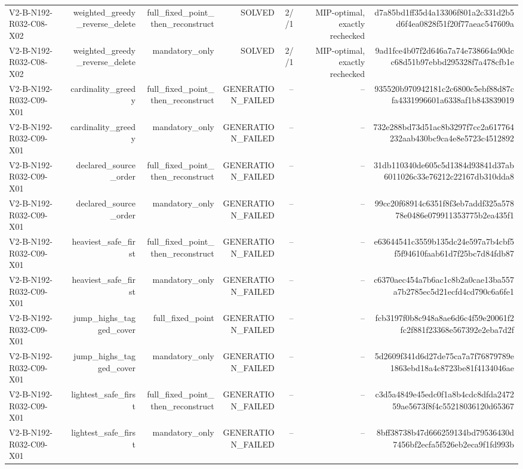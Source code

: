 {\begin{longtable}{lrrrrrr}
V2-B-N192-R032-C08-X02 & weighted\_greedy\_reverse\_delete & full\_fixed\_point\_then\_reconstruct & SOLVED & 2//1 & MIP-optimal, exactly rechecked & d7a85bd1ff35d4a13306f801a2c331d2b5d6f4ea0828f51f20f77aeac547609a \\
V2-B-N192-R032-C08-X02 & weighted\_greedy\_reverse\_delete & mandatory\_only & SOLVED & 2//1 & MIP-optimal, exactly rechecked & 9ad1fce4b07f2d646a7a74e738664a90dcc68d51b97ebbd295328f7a478cfb1e \\
V2-B-N192-R032-C09-X01 & cardinality\_greedy & full\_fixed\_point\_then\_reconstruct & GENERATION\_FAILED & -- & -- & 935520b970942181c2c6800c5ebf88d87cfa4331996601a6338af1b843839019 \\
V2-B-N192-R032-C09-X01 & cardinality\_greedy & mandatory\_only & GENERATION\_FAILED & -- & -- & 732e288bd73d51ac8b3297f7cc2a617764232aab430bc9ca4e8e5723c4512892 \\
V2-B-N192-R032-C09-X01 & declared\_source\_order & full\_fixed\_point\_then\_reconstruct & GENERATION\_FAILED & -- & -- & 31db110340de605c5d1384d93841d37ab6011026c33e76212c22167db310dda8 \\
V2-B-N192-R032-C09-X01 & declared\_source\_order & mandatory\_only & GENERATION\_FAILED & -- & -- & 99cc20f68914c6351f8f3eb7addf325a57878e0486e079911353775b2ea435f1 \\
V2-B-N192-R032-C09-X01 & heaviest\_safe\_first & full\_fixed\_point\_then\_reconstruct & GENERATION\_FAILED & -- & -- & e63644541c3559b135dc24e597a7b4cbf5f5f94610faab61d7f25bc7d84fdb87 \\
V2-B-N192-R032-C09-X01 & heaviest\_safe\_first & mandatory\_only & GENERATION\_FAILED & -- & -- & c6370aec454a7b6ac1c8b2a0cae13ba557a7b2785ec5d21ecfd4cd790c6a6fe1 \\
V2-B-N192-R032-C09-X01 & jump\_highs\_tagged\_cover & full\_fixed\_point & GENERATION\_FAILED & -- & -- & fcb3197f0b8c948a8ae6d6c4f59e20061f2fc2f881f23368e567392e2eba7d2f \\
V2-B-N192-R032-C09-X01 & jump\_highs\_tagged\_cover & mandatory\_only & GENERATION\_FAILED & -- & -- & 5d2609f341d6d27de75ca7a7f76879789e1863ebd18a4c8723be81f4134046ae \\
V2-B-N192-R032-C09-X01 & lightest\_safe\_first & full\_fixed\_point\_then\_reconstruct & GENERATION\_FAILED & -- & -- & c3d5a4849e45edc0f1a8b4cdc8dfda247259ae5673f8f4c55218036120d65367 \\
V2-B-N192-R032-C09-X01 & lightest\_safe\_first & mandatory\_only & GENERATION\_FAILED & -- & -- & 8bff38738b47d666259134bd79536430d7456bf2ecfa5f526eb2eca9f1fd993b \\

\end{longtable}}
